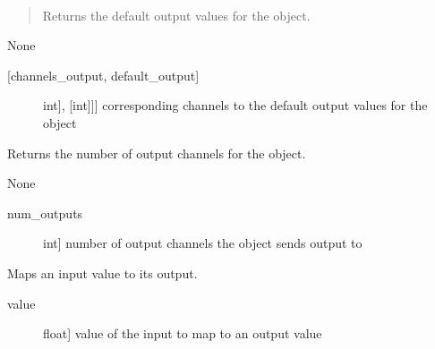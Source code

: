 \documentclass[letterpaper,10pt,english]{sphinxmanual}
\begin{document}
\begin{fulllineitems}
\begin{fulllineitems}
\label{\detokenize{base:OutputObject.OutputObject.get_default_outputs}}~\begin{quote}

\sphinxAtStartPar
Returns the default output values for the object.
\end{quote}

\sphinxAtStartPar
None
\begin{description}
\item[{{[}channels\_output, default\_output{]}}] \leavevmode{[}{[}{[}int{]}, {[}int{]}{]}{]}
\sphinxAtStartPar
corresponding channels to the default output values for the object

\end{description}

\end{fulllineitems}


\begin{fulllineitems}
\label{\detokenize{base:OutputObject.OutputObject.get_num_channels}}
\sphinxAtStartPar
Returns the number of output channels for the object.

\sphinxAtStartPar
None
\begin{description}
\item[{num\_outputs}] \leavevmode{[}int{]}
\sphinxAtStartPar
number of output channels the object sends output to

\end{description}

\end{fulllineitems}


\begin{fulllineitems}
\label{\detokenize{base:OutputObject.OutputObject.map_values}}
\sphinxAtStartPar
Maps an input value to its output.
\begin{description}
\item[{value}] \leavevmode{[}float{]}
\sphinxAtStartPar
value of the input to map to an output value


\end{description}
\end{fulllineitems}
\end{fulllineitems}
\end{document}
